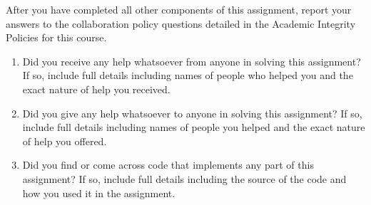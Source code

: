 \documentclass[11pt,addpoints,answers]{exam}
\numberwithin{equation}{section} %
\numberwithin{figure}{section} %
\numberwithin{table}{section} %
\begin{document}
    After you have completed all other components of this assignment, report your answers to the collaboration policy questions detailed in the Academic Integrity Policies for this course.
    \begin{enumerate}
        \item Did you receive any help whatsoever from anyone in solving this assignment? If so, include full details including names of people who helped you and the exact nature of help you received.
        
        \begin{tcolorbox}[fit,height=4cm, width=15cm, blank, borderline={1pt}{-2pt},nobeforeafter]
       \end{tcolorbox}
        \item Did you give any help whatsoever to anyone in solving this assignment? If so, include full details including names of people you helped and the exact nature of help you offered.
        
        \begin{tcolorbox}[fit,height=4cm, width=15cm, blank, borderline={1pt}{-2pt},nobeforeafter]
       \end{tcolorbox}
        \item Did you find or come across code that implements any part of this assignment? If so, include full details including the source of the code and how you used it in the assignment.
        
        \begin{tcolorbox}[fit,height=4cm, width=15cm, blank, borderline={1pt}{-2pt},nobeforeafter]
       \end{tcolorbox}
    \end{enumerate}
%
\end{document}
